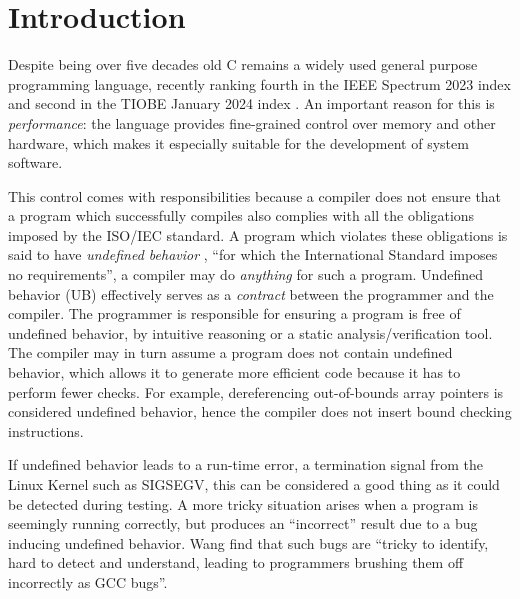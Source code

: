 \chapter{Introduction}\label{chap:introduction}
Despite being over five decades old C remains a widely used general purpose programming language,
recently ranking fourth in the IEEE Spectrum 2023 index \cite{ieee2023} and second in the TIOBE January 2024 index \cite{tiobe2024}.
An important reason for this is \textit{performance}: the language provides fine-grained control over memory and other hardware, which makes it especially suitable
for the development of system software.

This control comes with responsibilities because a compiler does not ensure
that a program which successfully compiles also complies with all the obligations imposed by the ISO/IEC standard.
A program which violates these obligations is said to have \textit{undefined behavior} \cite[3.4.3]{ISO:2018:III},
``for which the International Standard imposes no requirements'', \ie a compiler may do \textit{anything} for such a program.
Undefined behavior (UB) effectively serves as a \textit{contract} between the programmer and the compiler.
The programmer is responsible for ensuring a program is free of undefined behavior, \eg by intuitive reasoning
or a static analysis/verification tool.
The compiler may in turn assume a program does not contain undefined behavior, which allows it to generate more efficient code
because it has to perform fewer checks.
For example, dereferencing out-of-bounds array pointers is considered undefined behavior, hence the
compiler does not insert bound checking instructions.

If undefined behavior leads to a run-time error, \eg a termination signal from the Linux Kernel such as SIGSEGV, this can be considered 
a good thing as it could be detected during testing.
A more tricky situation arises when a program is seemingly running correctly, but produces an ``incorrect'' result
due to a bug inducing undefined behavior.
Wang \etall \cite{wang2012undefined} find that such bugs are ``tricky to identify, hard to detect and understand, leading to programmers brushing them off incorrectly as GCC bugs''.

